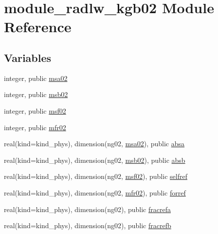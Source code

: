 \hypertarget{namespacemodule__radlw__kgb02}{}\section{module\+\_\+radlw\+\_\+kgb02 Module Reference}
\label{namespacemodule__radlw__kgb02}
\subsection*{Variables}
\begin{DoxyCompactItemize}
\item 
integer, public \hyperlink{namespacemodule__radlw__kgb02_a370b514d7834ac2a22d245f118882bf4}{msa02}
\item 
integer, public \hyperlink{group__module__radlw__main_ga03e70b84fd16795104a3fb7b425af70c}{msb02}
\item 
integer, public \hyperlink{group__module__radlw__main_ga99b728d38d664afc203303563541ab5c}{msf02}
\item 
integer, public \hyperlink{group__module__radlw__main_ga2973c2e9220e85b74f0b251c896aa837}{mfr02}
\item 
real(kind=kind\+\_\+phys), dimension(ng02, \hyperlink{namespacemodule__radlw__kgb02_a370b514d7834ac2a22d245f118882bf4}{msa02}), public \hyperlink{group__module__radlw__main_ga46db893d4456b2d867130bb208cb2206}{absa}
\item 
real(kind=kind\+\_\+phys), dimension(ng02, \hyperlink{group__module__radlw__main_ga03e70b84fd16795104a3fb7b425af70c}{msb02}), public \hyperlink{group__module__radlw__main_gacf34f9255586c9ed5ac5370db5b63c14}{absb}
\item 
real(kind=kind\+\_\+phys), dimension(ng02, \hyperlink{group__module__radlw__main_ga99b728d38d664afc203303563541ab5c}{msf02}), public \hyperlink{group__module__radlw__main_gaddb071e93b4ff49ba1f1c4d102e275f1}{selfref}
\item 
real(kind=kind\+\_\+phys), dimension(ng02, \hyperlink{group__module__radlw__main_ga2973c2e9220e85b74f0b251c896aa837}{mfr02}), public \hyperlink{group__module__radlw__main_gaf6f3d7a0ab6858eab9d4d3e2d2d68031}{forref}
\item 
real(kind=kind\+\_\+phys), dimension(ng02), public \hyperlink{group__module__radlw__main_gaf6db1580bd4a8b037cdd3e14765e2c83}{fracrefa}
\item 
real(kind=kind\+\_\+phys), dimension(ng02), public \hyperlink{group__module__radlw__main_gaeedda30c8d2bd7c9e7124c6445c8c20e}{fracrefb}
\end{DoxyCompactItemize}


